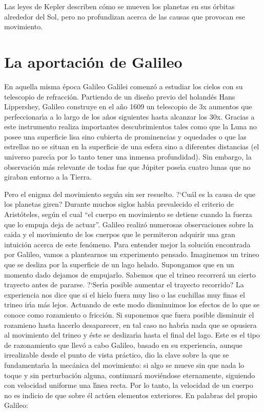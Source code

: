 Las leyes de Kepler describen c\'omo se
mueven los planetas en sus \'orbitas alrededor del Sol, pero no profundizan acerca de las causas que
provocan ese movimiento. 

\section{La aportaci\'on de Galileo} 
En aquella misma \'epoca Galileo Galilei comenz\'o a estudiar los cielos con su telescopio de refracci\'on. Partiendo de un dise\~{n}o previo del holand\'es Hans Lippershey, Galileo construye en el a\~{n}o 1609 un telescopio de 3x aumentos que perfeccionar\'\i{}a a lo largo de los a\~{n}os siguientes hasta alcanzar los 30x. Gracias a este instrumento realiza importantes descubrimientos tales como que la Luna no posee una superficie lisa sino cubierta de prominencias y oquedades o que las estrellas no se situan en la superficie de una esfera sino a diferentes distancias (el universo parec\'\i{}a por lo tanto tener una inmensa profundidad). Sin embargo, la observaci\'on m\'as relevante de todas fue que J\'upiter pose\'\i{}a cuatro lunas que no giraban entorno a la Tierra. 

Pero el enigma del movimiento segu\'\i{}a sin ser resuelto. ?`Cu\'al es la causa de que los planetas giren? Durante muchos siglos hab\'\i{}a prevalecido el criterio de Arist\'oteles, seg\'un el cual ``el cuerpo en movimiento se detiene cuando la fuerza que lo empuja deja de actuar''. Galileo realiz\'o numerosas observaciones sobre la caida y el movimiento de los cuerpos que le permiteron adquirir una gran intuici\'on acerca de este fen\'omeno. Para entender mejor la soluci\'on encontrada por Galileo, vamos a plantearnos un experimento pensado. Imaginemos un trineo que se desliza por la superficie de un lago helado. Supongamos que en un momento dado dejamos de empujarlo. Sabemos que el trineo recorrer\'a un cierto trayecto antes de pararse. ?`Ser\'\i{}a posible aumentar el trayecto recorrido? La experiencia nos dice que si el hielo fuera muy liso o las cuchillas muy finas el trineo ir\'\i{}a m\'as lejos. Actuando de este modo disminuimos los efectos de lo que se conoce como rozamiento o fricci\'on. Si suponemos que fuera posible disminuir el rozamieno hasta hacerlo desaparecer, en tal caso no habr\'\i{}a nada que se opusiera al movimiento del trineo y \'este se deslizar\'\i{}a hasta el final del lago. Este es el tipo de razonamiento que llev\'o a cabo Galileo, basado en su experiencia, aunque irrealizable desde el punto de vista pr\'actico, dio la clave sobre la que se fundamentar\'\i{}a la mec\'anica del movimiento: si algo se mueve sin que nada lo toque y sin perturbaci\'on alguna, continuar\'a movi\'endose eternamente, siguiendo con velocidad uniforme una l\'\i{}nea recta. Por lo tanto, la velocidad de un cuerpo no es indicio de que sobre \'el act\'uen elementos exteriores.
En palabras del propio Galileo:


